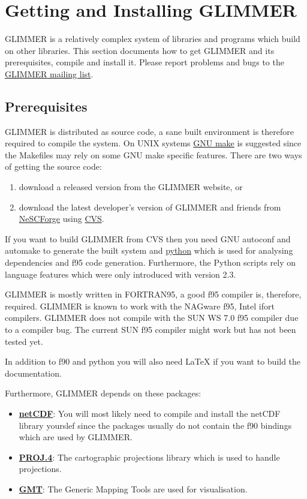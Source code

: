 \section{Getting and Installing GLIMMER}
GLIMMER is a relatively complex system of libraries and programs which build on other libraries. This section documents how to get GLIMMER and its prerequisites, compile and install it. Please report problems and bugs to the \href{http://forge.nesc.ac.uk/mailman/listinfo/glimmer-discuss}{GLIMMER mailing list}.

\subsection{Prerequisites}
GLIMMER is distributed as source code, a sane built environment is therefore required to compile the system. On UNIX systems \href{http://www.gnu.org/software/make/}{GNU make} is suggested since the Makefiles may rely on some GNU make specific features. There are two ways of getting the source code:
\begin{enumerate}
\item download a released version from the GLIMMER website, or
\item download the latest developer's version of GLIMMER and friends from \href{http://forge.nesc.ac.uk/}{NeSCForge} using \href{http://www.gnu.org/software/cvs/}{CVS}.
\end{enumerate}
If you want to build GLIMMER from CVS then you need GNU autoconf and automake to generate the built system and \href{http://www.python.org}{python} which is used for analysing dependencies and f95 code generation. Furthermore, the Python scripts rely on language features which were only introduced with version 2.3.

GLIMMER is mostly written in FORTRAN95, a good f95 compiler is, therefore, required. GLIMMER is known to work with the NAGware f95, Intel ifort compilers. GLIMMER does not compile with the SUN WS 7.0 f95 compiler due to a compiler bug. The current SUN f95 compiler might work but has not been tested yet.

In addition to f90 and python you will also need {\LaTeX} if you want to build the documentation.

Furthermore, GLIMMER depends on these packages:
\begin{itemize}
\item \href{http://www.unidata.ucar.edu/packages/netcdf/index.html}{{\bf netCDF}}: You will most likely need to compile and install the netCDF library yourslef since the packages usually do not contain the f90 bindings which are used by GLIMMER.
\item \href{http://www.remotesensing.org/proj}{{\bf PROJ.4}}: The cartographic projections library which is used to handle projections.
\item \href{http://gmt.soest.hawaii.edu/}{{\bf GMT}}: The Generic Mapping Tools are used for visualisation.
\end{itemize}

